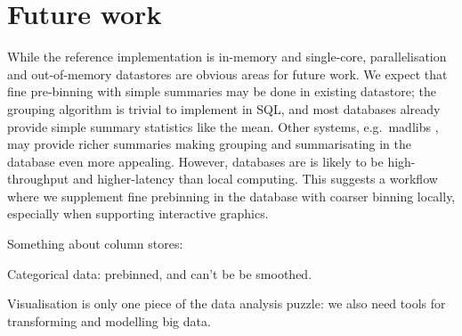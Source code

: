 \documentclass[journal]{vgtc}                %
\begin{document}

\section{Future work}
\label{sec:conclusion}

While the reference implementation is in-memory and single-core, parallelisation and out-of-memory datastores are obvious areas for future work. We expect that fine pre-binning with simple summaries may be done in existing datastore; the grouping algorithm is trivial to implement in SQL, and most databases already provide simple summary statistics like the mean. Other systems, e.g.\ madlibs \citep{hellerstein:2012}, may provide richer summaries making grouping and summarisating in the database even more appealing. However, databases are is likely to be high-throughput and higher-latency than local computing. This suggests a workflow where we supplement fine prebinning in the database with coarser binning locally, especially when supporting interactive graphics.

Something about column stores: \citep{kersten:2011}

Categorical data: prebinned, and can't be be smoothed.

Visualisation is only one piece of the data analysis puzzle: we also need tools for transforming and modelling big data. 





\end{document}
